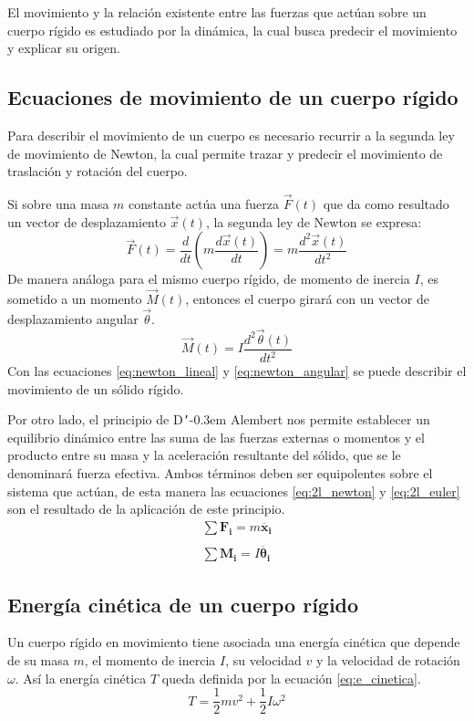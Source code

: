 El movimiento y la relación existente entre las fuerzas que actúan sobre un cuerpo rígido es estudiado por la dinámica, la cual busca predecir el movimiento y explicar su origen. 

\subsection{Ecuaciones de movimiento de un cuerpo rígido}
\label{sec:ec_mov}
Para describir el movimiento de un cuerpo es necesario recurrir a la segunda ley de movimiento de Newton, la cual permite trazar y predecir el movimiento de traslación y rotación del cuerpo.

Si sobre una masa $m$ constante actúa una fuerza $\vec{F}(t)$ que da como resultado un vector de desplazamiento $\vec{x}(t)$, la segunda ley de Newton se expresa:
\begin{equation}\label{eq:newton_lineal}
	\vec{F}(t) = \frac{d}{dt}\left(m\frac{d\vec{x}(t)}{dt}\right) = m \frac{d^2\vec{x}(t)}{dt^2}
\end{equation}
De manera análoga para el mismo cuerpo rígido, de momento de inercia $I$, es sometido a un momento $\vec{M}(t)$, entonces el cuerpo girará con un vector de desplazamiento angular $\vec{\theta}$.
\begin{equation}\label{eq:newton_angular}
	\vec{M}(t) = I\frac{d^2\vec{\theta}(t)}{dt^2}
\end{equation} 
Con las ecuaciones \ref{eq:newton_lineal} y \ref{eq:newton_angular} se puede describir el movimiento de un sólido rígido.

Por otro lado, el principio de D\texttt{'}\kern-0.3em Alembert nos permite establecer un equilibrio dinámico entre las suma de las fuerzas externas o momentos y el producto entre su masa y la aceleración resultante del sólido, que se le denominará fuerza efectiva. Ambos términos deben ser equipolentes sobre el sistema que actúan, de esta manera las ecuaciones \ref{eq:2l_newton} y \ref{eq:2l_euler} son el resultado de la aplicación de este principio.
\begin{gather}
	\sum \mathbf{F_i} = m\mathbf{\ddot{x_i}} \label{eq:2l_newton}\\
	\nonumber \\
	\sum \mathbf{M_i} = I\mathbf{\ddot{\theta_i}} \label{eq:2l_euler}
\end{gather}

\subsection{Energía cinética de un cuerpo rígido}
Un cuerpo rígido en movimiento tiene asociada una energía cinética que depende de su masa $m$, el momento de inercia $I$, su velocidad $v$ y la velocidad de rotación $\omega$. Así la energía cinética $T$ queda definida por la ecuación \ref{eq:e_cinetica}.
\begin{equation}\label{eq:e_cinetica}
	T = \frac{1}{2}mv^2 + \frac{1}{2}I\omega^2 
\end{equation}


